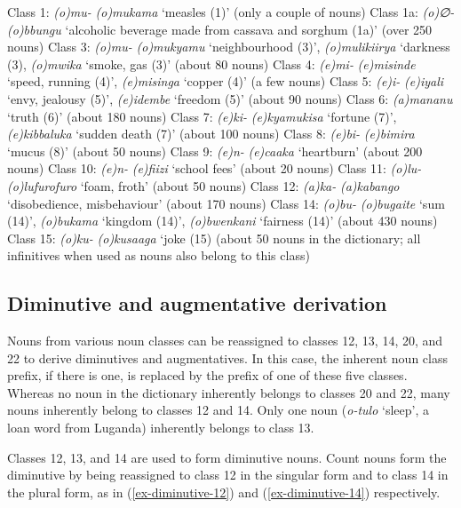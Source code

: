 \ea  \label{ex-NC-unpaired}
\begin{xlist}
\ex Class 1: \textit{(o)mu-} \textit{(o)mukama} ‘measles (1)’ (only a couple of nouns)
\ex Class 1a: \textit{(o)∅-} \textit{(o)bbungu} `alcoholic beverage made from cassava and sorghum (1a)' (over 250 nouns)
\ex Class 3: \textit{(o)mu-} \textit{(o)mukyamu} ‘neighbourhood (3)', \textit{(o)mulikiirya} ‘darkness (3), \textit{(o)mwika} ‘smoke, gas (3)’ (about 80 nouns)
\ex Class 4: \textit{(e)mi-} \textit{(e)misinde} ‘speed, running (4)’, \textit{(e)misinga} ‘copper (4)’ (a few nouns)
\ex Class 5: \textit{(e)i-} \textit{(e)iyali} `envy, jealousy (5)', \textit{(e)idembe} `freedom (5)' (about 90 nouns)
\ex Class 6:  \textit{(a)mananu} `truth (6)' (about 180 nouns)
\ex Class 7: \textit{(e)ki-} \textit{(e)kyamukisa} ‘fortune (7)’, \textit{(e)kibbaluka} ‘sudden death (7)’ (about 100 nouns)
\ex Class 8: \textit{(e)bi-} \textit{(e)bimira} ‘mucus (8)’ (about 50 nouns)
\ex Class 9: \textit{(e)n-} \textit{(e)caaka} `heartburn' (about 200 nouns)
\ex Class 10: \textit{(e)n-} \textit{(e)fiizi} `school fees' (about 20 nouns)
\ex Class 11: \textit{(o)lu-} \textit{(o)lufurofuro} `foam, froth' (about 50 nouns)
\ex Class 12: \textit{(a)ka-} \textit{(a)kabango} `disobedience, misbehaviour' (about 170 nouns)
\ex Class 14: \textit{(o)bu-} \textit{(o)bugaite} ‘sum (14)’, \textit{(o)bukama} ‘kingdom (14)’, \textit{(o)bwenkani} ‘fairness (14)’ (about 430 nouns)
\ex Class 15: \textit{(o)ku-} \textit{(o)kusaaga} ‘joke (15) (about 50 nouns in the dictionary; all infinitives when used as nouns also belong to this class)
\end{xlist}	
\z


\subsection{Diminutive and augmentative derivation}\label{sec-morh-diminutive}

Nouns from various noun classes can be reassigned to classes 12, 13, 14, 20, and 22 to derive diminutives and augmentatives. 
In this case, the inherent noun class prefix, if there is one, is replaced by the prefix of one of these five classes. 
Whereas no noun in the dictionary inherently belongs to classes 20 and 22, many nouns inherently belong to classes 12 and 14. 
Only one noun (\textit{o-tulo} `sleep', a loan word from Luganda) inherently belongs to class 13.

Classes 12, 13, and 14 are used to form diminutive nouns. 
Count nouns form the diminutive by being reassigned to class 12 in the singular form and to class 14 in the plural form, as in (\ref {ex-diminutive-12}) and (\ref{ex-diminutive-14}) respectively.

